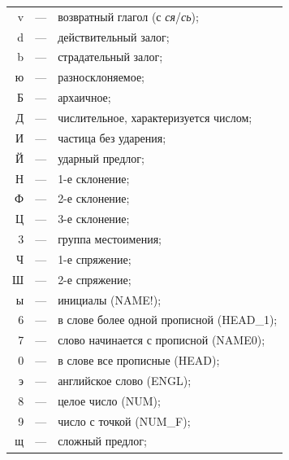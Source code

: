 \begin{tabular}{rcl}
    v&---& возвратный глагол (с \textit{ся}/\textit{сь});\\

    d&---& действительный залог;\\

    b&---& страдательный залог;\\

    ю&---& разносклоняемое;\\

    Б&---& архаичное;\\

    Д&---& числительное, характеризуется числом;\\

    И&---& частица без ударения;\\

    Й&---& ударный предлог;\\

    Н&---& 1-е склонение;\\

    Ф&---& 2-е склонение;\\

    Ц&---& 3-е склонение;\\

    3&---& группа местоимения;\\

    Ч&---& 1-е спряжение;\\

    Ш&---& 2-е спряжение;\\

    ы&---& инициалы (NAME!);\\

    6&---& в слове более одной прописной (HEAD\_1);\\

    7&---& слово начинается с прописной (NAME0);\\

    0&---& в слове все прописные (HEAD);\\

    э&---& английское слово (ENGL);\\

    8&---& целое число (NUM);\\

    9&---& число с точкой (NUM\_F);\\

    щ&---& сложный предлог;

        \end{tabular}



